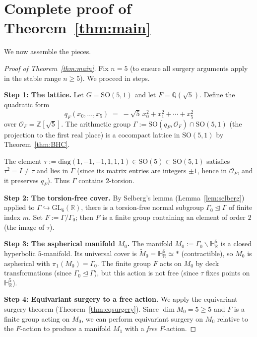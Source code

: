 \documentclass[12pt]{article}
\newcommand{\R}{\mathbb{R}}
\newcommand{\Z}{\mathbb{Z}}
\newcommand{\Q}{\mathbb{Q}}
\newcommand{\HH}{\mathbb{H}}
\newcommand{\SO}{\mathrm{SO}}
\newcommand{\GL}{\mathrm{GL}}
\newcommand{\tilM}{\widetilde{M}}
\begin{document}
\section{Complete proof of Theorem~\ref{thm:main}}
\label{sec:proof}

We now assemble the pieces.

\begin{proof}[Proof of Theorem~\ref{thm:main}]
Fix $n = 5$ (to ensure all surgery arguments apply in the stable range $n \geq 5$).  We proceed
in steps.

\textbf{Step 1: The lattice.}
Let $G = \SO(5,1)$ and let $F = \Q(\sqrt{5})$.  Define the quadratic form
\[
  q_F(x_0, \ldots, x_5) \;=\; -\sqrt{5}\, x_0^2 + x_1^2 + \cdots + x_5^2
\]
over $\mathcal{O}_F = \Z[\sqrt{5}]$.  The arithmetic group
$\Gamma := \SO(q_F, \mathcal{O}_F) \cap \SO(5,1)$ (the projection to the first real place) is a
cocompact lattice in $\SO(5,1)$ by Theorem~\ref{thm:BHC}.

The element $\tau := \mathrm{diag}(1,-1,-1,1,1,1) \in \SO(5) \subset \SO(5,1)$ satisfies
$\tau^2 = I \neq \tau$ and lies in $\Gamma$ (since its matrix entries are integers $\pm 1$, hence
in $\mathcal{O}_F$, and it preserves $q_F$).  Thus $\Gamma$ contains 2-torsion.

\textbf{Step 2: The torsion-free cover.}
By Selberg's lemma (Lemma~\ref{lem:selberg}) applied to $\Gamma \hookrightarrow \GL_6(\R)$,
there is a torsion-free normal subgroup $\Gamma_0 \trianglelefteq \Gamma$ of finite index $m$.
Set $F := \Gamma/\Gamma_0$; then $F$ is a finite group containing an element of order $2$ (the
image of $\tau$).

\textbf{Step 3: The aspherical manifold $M_0$.}
The manifold $M_0 := \Gamma_0 \backslash \HH^5_\R$ is a closed hyperbolic $5$-manifold.
Its universal cover is $\tilM_0 = \HH^5_\R \simeq *$ (contractible), so $M_0$ is aspherical
with $\pi_1(M_0) = \Gamma_0$.  The finite group $F$ acts on $M_0$ by deck transformations (since
$\Gamma_0 \trianglelefteq \Gamma$), but this action is not free (since $\tau$ fixes points on
$\HH^5_\R$).

\textbf{Step 4: Equivariant surgery to a free action.}
We apply the equivariant surgery theorem (Theorem~\ref{thm:eqsurgery}).  Since $\dim M_0 = 5
\geq 5$ and $F$ is a finite group acting on $M_0$, we can perform equivariant surgery on $M_0$
relative to the $F$-action to produce a manifold $M_1$ with a \emph{free} $F$-action.


\end{proof}
\end{document}
